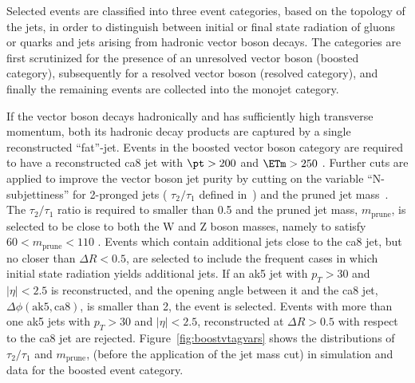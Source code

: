 Selected events are classified into three event categories, based on the topology of the jets, in order to distinguish between 
initial or final state radiation of gluons or quarks and jets arising from hadronic vector boson decays.
The categories are first scrutinized for the presence of an unresolved
vector boson (boosted category), subsequently for a resolved vector
boson (resolved category), and finally the remaining events are collected into the monojet category. 

If the vector boson decays hadronically and has sufficiently high transverse momentum, both its hadronic
decay products are captured by a single reconstructed ``fat''-jet.
Events in the boosted vector boson category are required to
have a reconstructed ca8 jet with $\pt>200$ \gev and  $\ETm>250$ \gev.  Further cuts are applied to improve the vector boson jet
purity by cutting on the variable ``N-subjettiness'' for 2-pronged
jets ( $\tau_2/\tau_1$ defined in~\cite{Thaler:2010tr,Thaler:2011gf})
and the pruned jet mass~\cite{Ellis:2009me}. The $\tau_2/\tau_1$ ratio
is required to smaller than 0.5 and the pruned jet mass, $m_{\mathrm{prune}}$, is selected to
be close to both the W and Z boson masses, namely to satisfy $60<m_{\mathrm{prune}}<110$ \gev.   
Events which contain additional jets close to the ca8 jet, but no closer than $\Delta R < 0.5$,
are selected to include the frequent cases in which initial state radiation yields additional jets. 
If an ak5 jet with $p_T>30$ and $|\eta|<2.5$ is reconstructed, and the opening angle between it 
and the ca8 jet, $\Delta\phi(\mathrm{ak5,ca8})$, is smaller than 2, the event is selected. Events with more than one ak5 jets 
with $p_T>30$ \gev and $|\eta|<2.5$, reconstructed at $\Delta R> 0.5$ with respect to the ca8 jet 
are rejected.
Figure~\ref{fig:boostvtagvars} shows the distributions of $\tau_2/\tau_1$ and $m_{\mathrm{prune}}$, (before the application 
of the jet mass cut) in simulation and data for the boosted event category. 
